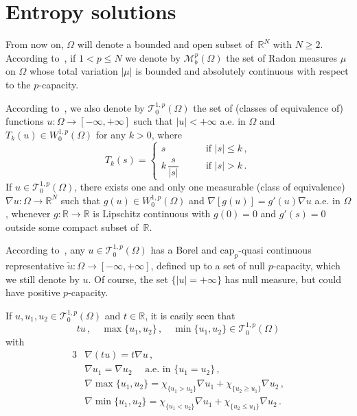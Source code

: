 \documentclass[twoside,reqno]{amsart}
\numberwithin{equation}{section}
\theoremstyle{definition}
\newcommand{\R}{\mathbb{R}}
\begin{document}

\section{Entropy solutions}
\label{sect:entropy}
%
From now on, $\Omega$ will denote a bounded and open 
subset of~$\R^N$ with $N\geq 2$.
According 
to~\cite{boccardo_gallouet_orsina1996}, if $1<p\leq N$ we denote 
by $\mathcal{M}_b^p(\Omega)$ the set of Radon measures $\mu$
on $\Omega$ whose total variation $|\mu|$ is bounded and absolutely
continuous with respect to the $p$-capacity.
\par
According 
to~\cite{benilan_boccardo_gallouet_gariepy_pierre_vazquez1995,
boccardo_gallouet_orsina1996}, we also denote by 
$\mathcal{T}^{1,p}_0(\Omega)$ the set of (classes of equivalence
of) functions $u:\Omega\rightarrow[-\infty,+\infty]$ such that
$|u|<+\infty$ a.e. in $\Omega$ and $T_k(u)\in W^{1,p}_0(\Omega)$ 
for any $k>0$, where
\[
T_k(s)=
\begin{cases}
s &\qquad\text{if $|s|\leq k$}\,,\\
k\,\dfrac{s}{|s|}
&\qquad\text{if $|s| > k$}\,.
\end{cases}
\]
If $u\in \mathcal{T}^{1,p}_0(\Omega)$, 
there exists one 
and only one measurable (class of equivalence)
$\nabla u:\Omega\rightarrow\R^N$ such that
$g(u)\in W^{1,p}_0(\Omega)$ and 
$\nabla[g(u)]=g'(u)\nabla u$ a.e. in $\Omega$,
whenever $g:\R\rightarrow\R$ is Lipschitz continuous with 
$g(0)=0$ and $g'(s)=0$ outside some compact subset 
of~$\R$.
\par
According to~\cite{dalmaso_murat_orsina_prignet1999}, any
$u\in\mathcal{T}^{1,p}_0(\Omega)$ has a Borel and
$\mathrm{cap}_p$-quasi continuous representative
$\tilde{u}:\Omega\rightarrow[-\infty,+\infty]$, defined up to 
a set of null $p$-capacity, which we still denote by $u$.
Of course, the set $\{|u|=+\infty\}$ has null measure, but could 
have positive $p$-capacity.
\par
If $u, u_1, u_2 \in \mathcal{T}^{1,p}_0(\Omega)$ and
$t\in\R$, it is easily seen that
\[
tu\,,\quad \max\{u_1,u_2\}\,,\quad 
\min\{u_1,u_2\}\in \mathcal{T}^{1,p}_0(\Omega)
\]
with
\begin{alignat*}{3}
&\nabla (tu) = t\nabla u\,,\\
&\text{$\nabla u_1 = \nabla u_2\quad$ a.e. in $\{u_1=u_2\}$}\,,\\
&\nabla \max\{u_1,u_2\} = 
\chi_{\{u_1>u_2\}}\nabla u_1 
+ \chi_{\{u_2\geq u_1\}}\nabla u_2\,,\\
&\nabla \min\{u_1,u_2\} = 
\chi_{\{u_1<u_2\}}\nabla u_1 
+ \chi_{\{u_2\leq u_1\}}\nabla u_2\,.
\end{alignat*}
\end{document}
